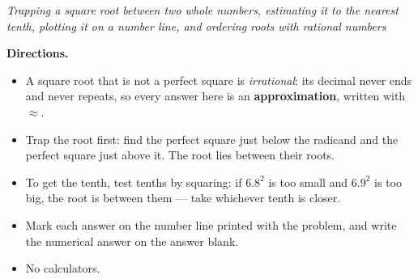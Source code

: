 \documentclass[12pt]{article}
\begin{document}

\begin{center}
\textit{Trapping a square root between two whole numbers, estimating it to the
nearest tenth, plotting it on a number line, and ordering roots with rational
numbers}
\end{center}

\noindent\textbf{Directions.}
\begin{itemize}[leftmargin=1.2cm, itemsep=2pt, topsep=2pt]
\item A square root that is not a perfect square is \emph{irrational}: its
decimal never ends and never repeats, so every answer here is an
\textbf{approximation}, written with $\approx$.
\item Trap the root first: find the perfect square just below the radicand and
the perfect square just above it. The root lies between their roots.
\item To get the tenth, test tenths by squaring: if $6.8^2$ is too small and
$6.9^2$ is too big, the root is between them --- take whichever tenth is
closer.
\item Mark each answer on the number line printed with the problem, and write
the numerical answer on the answer blank.
\item No calculators.
\end{itemize}

\vspace{0.2cm}


\end{document}
